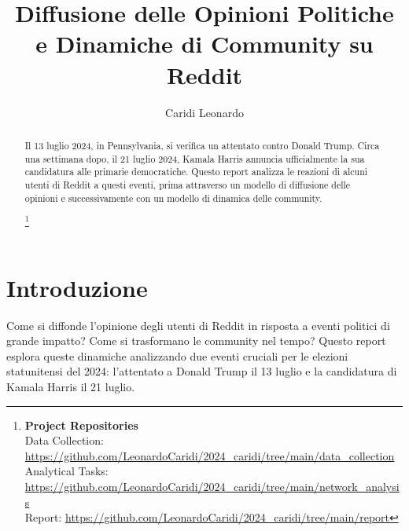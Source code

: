 \documentclass[sigchi]{acmart}
\begin{document}
%
\title{Diffusione delle Opinioni Politiche e Dinamiche di Community su Reddit}

\author{Caridi Leonardo}




\begin{abstract}
Il 13 luglio 2024, in Pennsylvania, si verifica un attentato contro Donald Trump. Circa una settimana dopo, il 21 luglio 2024, Kamala Harris annuncia ufficialmente la sua candidatura alle primarie democratiche. Questo report analizza le reazioni di alcuni utenti di Reddit a questi eventi, prima attraverso un modello di diffusione delle opinioni e successivamente con un modello di dinamica delle community.

\footnote{
{\bf Project Repositories}\\
\noindent Data Collection: \url{https://github.com/LeonardoCaridi/2024_caridi/tree/main/data_collection}\\
\noindent Analytical Tasks: \url{https://github.com/LeonardoCaridi/2024_caridi/tree/main/network_analysis}\\
\noindent Report: \url{https://github.com/LeonardoCaridi/2024_caridi/tree/main/report}}
\end{abstract}


%


%
\maketitle

\section{Introduzione} \label{sec:introduction}
Come si diffonde l'opinione degli utenti di Reddit in risposta a eventi politici di grande impatto? Come si trasformano le community nel tempo? Questo report esplora queste dinamiche analizzando due eventi cruciali per le elezioni statunitensi del 2024: l'attentato a Donald Trump il 13 luglio e la candidatura di Kamala Harris il 21 luglio.
\end{document}

